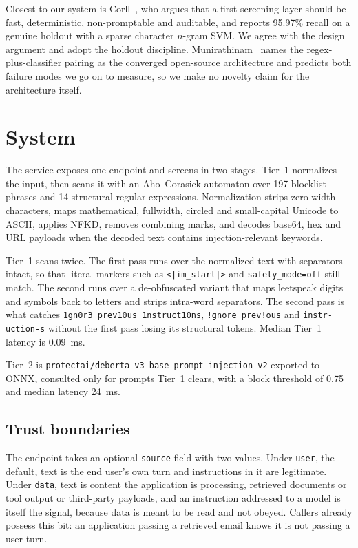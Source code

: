 \documentclass[sigconf,anonymous,review]{acmart}
\begin{document}
Closest to our system is Corll~\cite{corll2026mirror}, who argues that a first
screening layer should be fast, deterministic, non-promptable and auditable, and
reports 95.97\% recall on a genuine holdout with a sparse character $n$-gram SVM.
We agree with the design argument and adopt the holdout discipline.
Munirathinam~\cite{munirathinam2026beyond} names the regex-plus-classifier
pairing as the converged open-source architecture and predicts both failure modes
we go on to measure, so we make no novelty claim for the architecture itself.

\section{System}

The service exposes one endpoint and screens in two stages. Tier~1 normalizes the
input, then scans it with an Aho--Corasick automaton over 197 blocklist phrases
and 14 structural regular expressions. Normalization strips zero-width
characters, maps
mathematical, fullwidth, circled and small-capital Unicode to ASCII, applies
NFKD, removes combining marks, and decodes base64, hex and URL payloads when the
decoded text contains injection-relevant keywords.

Tier~1 scans twice. The first pass runs over the normalized text with separators
intact, so that literal markers such as \texttt{<|im\_start|>} and
\texttt{safety\_mode=off} still match. The second runs over a de-obfuscated
variant that maps leetspeak digits and symbols back to letters and strips
intra-word separators. The second pass is what catches \texttt{1gn0r3 prev10us
1nstruct10ns}, \texttt{!gnore prev!ous} and \texttt{instr-uction-s} without the
first pass losing its structural tokens. Median Tier~1 latency is 0.09~ms.

Tier~2 is \texttt{protectai/deberta-v3-base-prompt-injection-v2} exported to
ONNX, consulted only for prompts Tier~1 clears, with a block threshold of 0.75
and median latency 24~ms.

\subsection{Trust boundaries}

The endpoint takes an optional \texttt{source} field with two values. Under
\texttt{user}, the default, text is the end user's own turn and instructions in
it are legitimate. Under \texttt{data}, text is content the application is
processing, retrieved documents or tool output or third-party payloads, and an
instruction addressed to a model is itself the signal, because data is meant to
be read and not obeyed. Callers already possess this bit: an application passing
a retrieved email knows it is not passing a user turn.
\end{document}
